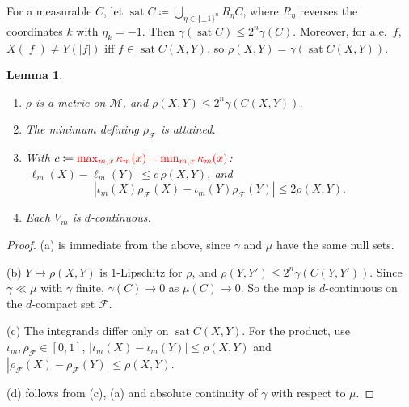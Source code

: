 \documentclass[11pt]{article}
\newcommand{\chg}[1]{{\color{red}#1}}
\newtheorem{lemma}[theorem]{Lemma}
\theoremstyle{definition}
\theoremstyle{remark}
\newcommand{\M}{\mathcal M}
\newcommand{\F}{\mathcal F}
\newcommand{\sat}{\operatorname{sat}}
\begin{document}
For a measurable $C$, let $\sat C\coloneqq\bigcup_{\eta\in\{\pm1\}^n}R_\eta C$, where $R_\eta$ reverses the coordinates $k$ with $\eta_k=-1$. Then $\gamma(\sat C)\le2^n\gamma(C)$. Moreover\chg{, for a.e.\ $f$,} $X(|f|)\neq Y(|f|)$ iff $f\in\sat C(X,Y)$, so $\rho(X,Y)=\gamma(\sat C(X,Y))$.

\begin{lemma}\label{lem:lipschitz}
\begin{enumerate}[label=\textup{(\alph*)}]
\item $\rho$ is a \chg{metric on $\M$}, and $\rho(X,Y)\le 2^n\gamma(C(X,Y))$.
\item The minimum defining $\rho_\F$ is attained.
\item With $c\coloneqq\chg{\max_{m,x}\kappa_m(x)-\min_{m,x}\kappa_m(x)}$: $|\ell_m(X)-\ell_m(Y)|\le c\,\rho(X,Y)$, and
\[|\iota_m(X)\rho_\F(X)-\iota_m(Y)\rho_\F(Y)|\le2\rho(X,Y).\]
\item Each $V_m$ is $d$-continuous.
\end{enumerate}
\end{lemma}
\begin{proof}
(a) is immediate from the above, since $\gamma$ and $\mu$ have the same null sets.

(b) $Y\mapsto\rho(X,Y)$ is $1$-Lipschitz for $\rho$, and $\rho(Y,Y')\le2^n\gamma(C(Y,Y'))$. Since $\gamma\ll\mu$ with $\gamma$ finite, $\gamma(C)\to0$ as $\mu(C)\to0$. So the map is $d$-continuous on the $d$-compact set $\F$.

(c) The integrands differ only on $\sat C(X,Y)$. For the product, use $\iota_m,\rho_\F\in[0,1]$, $|\iota_m(X)-\iota_m(Y)|\le\rho(X,Y)$ and $|\rho_\F(X)-\rho_\F(Y)|\le\rho(X,Y)$.

(d) follows from (c), (a) and absolute continuity of $\gamma$ with respect to $\mu$.
\end{proof}
\end{document}
